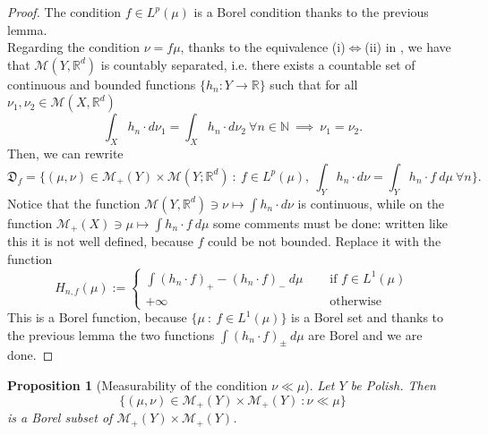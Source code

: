 \documentclass[10pt,leqno]{amsart}
\numberwithin{equation}{section}
\newtheorem{prop}[teorema]{Proposition}
\newcommand{\R}{\mathbb{R}}
\newcommand{\N}{\mathbb{N}}
\begin{document}
\begin{proof}
    The condition $f\in L^p(\mu)$ is a Borel condition thanks to the previous lemma. 
    \\
    Regarding the condition $\nu = f\mu$, thanks to the equivalence (i)$\iff$(ii) in  \cite[Theorem 8.10.39]{Bogachev07}, we have that $\mathcal{M}(Y,\R^d)$ is countably separated, i.e. there exists a countable set of continuous and bounded functions $\{h_n:Y \to \R\}$ such that for all $\nu_1,\nu_2\in \mathcal{M}(X,\R^d)$
    \[\int_X h_n \cdot d\nu_1 = \int_X h_n \cdot d\nu_2 \ \forall n\in \N \ \implies \ \nu_1 = \nu_2.\]
    Then, we can rewrite 
    \[\mathfrak{D}_f = \{(\mu,\nu) \in \mathcal{M}_+(Y)\times \mathcal{M}(Y;\R^d) \ : \ f\in L^p(\mu), \ \int_Y h_n\cdot d\nu = \int_Y h_n\cdot f \ d\mu \ \forall n\}.\]
    Notice that the function $\mathcal{M}(Y,\R^d)\ni\nu\mapsto \int h_n \cdot d\nu$ is continuous, while on the function $\mathcal{M}_+(X)\ni\mu \mapsto \int h_n\cdot f \ d\mu$ some comments must be done: written like this it is not well defined, because $f$ could be not bounded. Replace it with the function
    \[H_{n,f}(\mu) := 
    \begin{cases}
        \int (h_n\cdot f)_+ - (h_n \cdot f)_- \ d\mu\quad & \text{ if } f\in L^1(\mu)
        \\
        +\infty \quad \quad \quad & \text{ otherwise}
    \end{cases}\]
    This is a Borel function, because $\{\mu \ : \ f\in L^1(\mu)\}$ is a Borel set and thanks to the previous lemma the two functions $\int (h_n\cdot f)_\pm \ d\mu$ are Borel and we are done.
\end{proof}


\begin{prop}[Measurability of the condition $\nu\ll\mu$]
    Let $Y$ be Polish. Then 
    \[\{(\mu,\nu) \in \mathcal{M}_+(Y) \times \mathcal{M}_+(Y) \ : \nu\ll\mu\}\]
    is a Borel subset of $\mathcal{M}_+(Y)\times\mathcal{M}_+(Y)$.
\end{prop}
\end{document}
